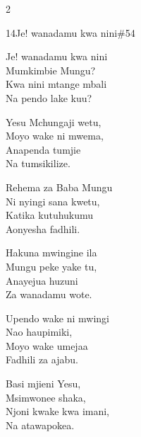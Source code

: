 \begin{multicols}{2}
\begin{hymn}{14}{Je! wanadamu kwa nini}{\#54}
\begin{stanza}
Je! wanadamu kwa nini\\
Mumkimbie Mungu?\\
Kwa nini mtange mbali\\
Na pendo lake kuu?
\end{stanza}
\begin{stanza}
Yesu Mchungaji wetu,\\
Moyo wake ni mwema,\\
Anapenda tumjie\\
Na tumsikilize.
\end{stanza}
\begin{stanza}
Rehema za Baba Mungu\\
Ni nyingi sana kwetu,\\
Katika kutuhukumu\\
Aonyesha fadhili.
\end{stanza}
\begin{stanza}
Hakuna mwingine ila\\
Mungu peke yake tu,\\
Anayejua huzuni\\
Za wanadamu wote.
\end{stanza}
\begin{stanza}
Upendo wake ni mwingi\\
Nao haupimiki,\\
Moyo wake umejaa\\
Fadhili za ajabu.
\end{stanza}
\begin{stanza}
Basi mjieni Yesu,\\
Msimwonee shaka,\\
Njoni kwake kwa imani,\\
Na atawapokea.
\end{stanza}
\end{hymn}


\end{multicols}

